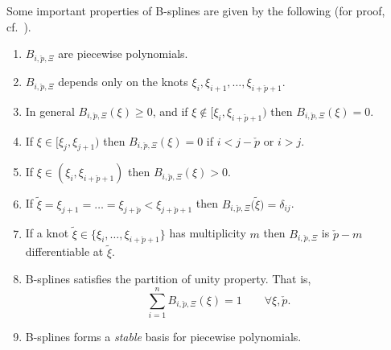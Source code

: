 Some important properties of B-splines are given by the following (for proof, cf.~\cite{Lyche2008smd}).
\label{List:properties}
\begin{enumerate}
	\item $B_{i,\check{p},\Xi}$ are piecewise polynomials.
	\item $B_{i,\check{p},\Xi}$ depends only on the knots $\xi_i,\xi_{i+1},\dots,\xi_{i+\check{p}+1}$.
	\item In general $B_{i,\check{p},\Xi}(\xi)\geq 0$, and if $\xi\not\in [\xi_i, \xi_{i+\check{p}+1})$ then $B_{i,\check{p},\Xi}(\xi) = 0$.
	\item If $\xi\in [\xi_j, \xi_{j+1})$ then $B_{i,\check{p},\Xi}(\xi) = 0$ if $i < j-\check{p}$ or $i>j$.
	\item If $\xi\in (\xi_i,\xi_{i+\check{p}+1})$ then $B_{i,\check{p},\Xi}(\xi) > 0$.
	\item If $\tilde{\xi} = \xi_{j+1} = \dots = \xi_{j+\check{p}} < \xi_{j+\check{p}+1}$ then $B_{i,\check{p},\Xi}\Big(\tilde{\xi}\Big) = \delta_{ij}$.
	\item If a knot $\tilde{\xi}\in \{\xi_i,\dots,\xi_{i+\check{p}+1}\}$ has multiplicity $m$ then $B_{i,\check{p},\Xi}$ is $\check{p}-m$ differentiable at $\tilde{\xi}$.
	\item B-splines satisfies the partition of unity property. That is,
	\begin{equation*}
		 \sum_{i=1}^{n} B_{i,\check{p},\Xi}(\xi) = 1\qquad\forall \xi, \check{p}.
	\end{equation*}
	\item B-splines forms a \textit{stable} basis for piecewise polynomials.
\end{enumerate}


